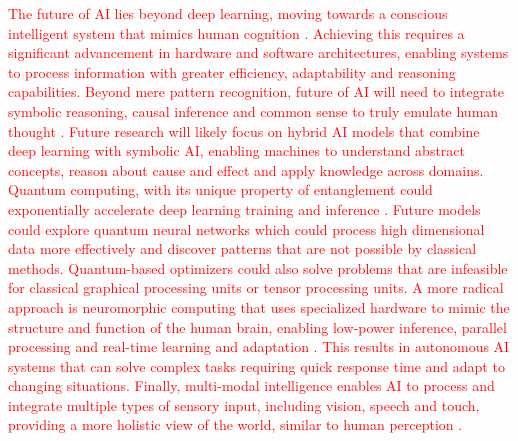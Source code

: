 \documentclass[preprint,12pt]{elsarticle}
\begin{document}
\textcolor{red}{The future of AI lies beyond deep learning, moving towards a conscious intelligent system that mimics human cognition \citep{butlin_consciousness_2023}. Achieving this requires a significant advancement in hardware and software architectures, enabling systems to process information with greater efficiency, adaptability and reasoning capabilities. Beyond mere pattern recognition, future of AI will need to integrate symbolic reasoning, causal inference and common sense to truly emulate human thought \citep{marra_statistical_2024, colelough_neuro-symbolic_2025, bhuyan_neuro-symbolic_2024}. Future research will likely focus on hybrid AI models that combine deep learning with symbolic AI, enabling machines to understand abstract concepts, reason about cause and effect and apply knowledge across domains. Quantum computing, with its unique property of entanglement could exponentially accelerate deep learning training and inference \citep{wu_survey_2025, klusch_quantum_2024}. Future models could explore quantum neural networks which could process high dimensional data more effectively and discover patterns that are not possible by classical methods. Quantum-based optimizers could also solve problems that are infeasible for classical graphical processing units or tensor processing units. A more radical approach is neuromorphic computing that uses specialized hardware to mimic the structure and function of the human brain, enabling low-power inference, parallel processing and real-time learning and adaptation \citep{shrestha_survey_2022, kudithipudi_neuromorphic_2025}. This results in autonomous AI systems that can solve complex tasks requiring quick response time and adapt to changing situations. Finally, multi-modal intelligence enables AI to process and integrate multiple types of sensory input, including vision, speech and touch, providing a more holistic view of the world, similar to human perception \citep{fei_towards_2022}. }
\end{document}
